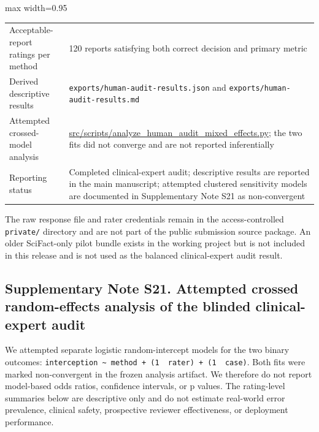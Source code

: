 \documentclass[
  8pt,
]{extarticle}
\begin{document}
\begin{center}
\begin{adjustbox}{max width=0.95\textwidth}
\begin{tabular}{@{}
ll@{}}
Acceptable-report ratings per method & 120 reports satisfying both
correct decision and primary metric \\
Derived descriptive results & \texttt{exports/human-audit-results.json}
and \texttt{exports/human-audit-results.md} \\
Attempted crossed-model analysis &
\url{src/scripts/analyze\_human\_audit\_mixed\_effects.py}; the two
fits did not converge and are not reported inferentially \\
Reporting status & Completed clinical-expert audit; descriptive results
are reported in the main manuscript; attempted clustered sensitivity
models are documented in Supplementary Note S21 as non-convergent \\
\bottomrule
\end{tabular}
\end{adjustbox}
\end{center}

The raw response file and rater credentials remain in the
access-controlled \texttt{private/} directory and are not part of the
public submission source package. An older SciFact-only pilot bundle
exists in the working project but is not included in this release and is
not used as the balanced clinical-expert audit result.

\hypertarget{supplementary-note-s21-attempted-crossed-random-effects-analysis-of-the-blinded-clinical-expert-audit}{%
\subsection{Supplementary Note S21. Attempted crossed random-effects
analysis of the blinded clinical-expert
audit}\label{supplementary-note-s21-attempted-crossed-random-effects-analysis-of-the-blinded-clinical-expert-audit}}

We attempted separate logistic random-intercept models for the two
binary outcomes:
\texttt{interception\ \textasciitilde{}\ method\ +\ (1\ \textbar{}\ rater)\ +\ (1\ \textbar{}\ case)}.
Both fits were marked non-convergent in the frozen analysis artifact. We
therefore do not report model-based odds ratios, confidence intervals,
or p values. The rating-level summaries below are descriptive only and
do not estimate real-world error prevalence, clinical safety,
prospective reviewer effectiveness, or deployment performance.
\end{document}
